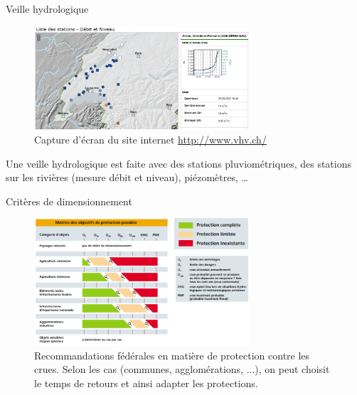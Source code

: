\documentclass{beamer}
\begin{document}
\begin{frame}{Veille hydrologique}
    \begin{figure}
        \centering
        \includegraphics[width=8cm]{veilleHydrologique_VAUD.png}
        \caption{Capture d'écran du site internet \href{http://www.vhv.ch/}{http://www.vhv.ch/}}
    \end{figure}
    Une veille hydrologique est faite avec des stations pluviométriques, des stations sur les rivières (mesure débit et niveau), piézomètres, \dots
\end{frame}

\begin{frame}{Critères de dimensionnement}
    \begin{figure}
        \centering
        \includegraphics[width=8cm]{matriceObjectifsDimensionnement.png}
        \caption{Recommandations fédérales en matière de protection contre les crues. Selon les cas (communes, agglomérations, ...), on peut choisit le temps de retours et ainsi adapter les protections.}
    \end{figure}
\end{frame}

\end{document}
